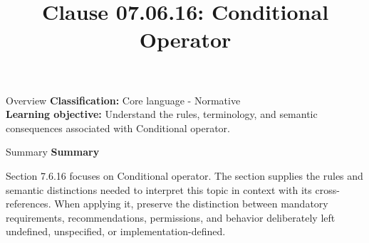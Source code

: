 \documentclass[10pt,letterpaper]{article}
\title{Clause 07.06.16: Conditional Operator}
\author{}
\date{}
\begin{document}
\maketitle
\begin{CornellOverviewBox}{Overview}
\textbf{Classification:} Core language - Normative\\[2pt]
\textbf{Learning objective:} Understand the rules, terminology, and semantic consequences associated with Conditional operator.
\end{CornellOverviewBox}\begin{CornellSummaryBox}{Summary}
{\sffamily\bfseries\color{Accent} Summary}\par\vspace{3pt}Section 7.6.16 focuses on Conditional operator. The section supplies the rules and semantic distinctions needed to interpret this topic in context with its cross-references. When applying it, preserve the distinction between mandatory requirements, recommendations, permissions, and behavior deliberately left undefined, unspecified, or implementation-defined.
\end{CornellSummaryBox}
\end{document}
